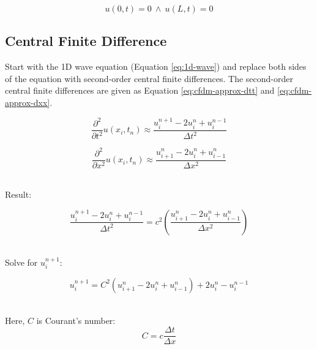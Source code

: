 \documentclass{article}
\begin{document}
\begin{equation}
    u(0,t)=0\ \wedge\ u(L,t)=0
    \label{eq:bc}
\end{equation}

\subsection{Central Finite Difference}


Start with the 1D wave equation (Equation \ref{eq:1d-wave}) and replace both sides of the equation with second-order central finite differences. The second-order central finite differences are given as Equation \ref{eq:cfdm-approx-dtt} and \ref{eq:cfdm-approx-dxx}.

\begin{equation}
    \frac{\partial^2}{\partial t^2}u(x_i,t_n)\approx \frac{u_i^{n+1}-2u_i^n+u_i^{n-1}}{\Delta t^2}
    \label{eq:cfdm-approx-dtt}
\end{equation}

\begin{equation}
    \frac{\partial^2}{\partial x^2}u(x_i,t_n)\approx \frac{u_{i+1}^{n}-2u_i^n+u_{i-1}^{n}}{\Delta x^2}
    \label{eq:cfdm-approx-dxx}
\end{equation}

\newpage
\noindent\\Result:

\begin{equation}
    \frac{u_i^{n+1}-2u_i^n+u_i^{n-1}}{\Delta t^2}
    = c^2\left(
    \frac{u_{i+1}^{n}-2u_i^n+u_{i-1}^{n}}{\Delta x^2}
    \right)
    \label{}
\end{equation}

\noindent\\Solve for $u_i^{n+1}$:

\begin{equation}
    u_i^{n+1} = C^2(u_{i+1}^n - 2u_i^n + u_{i-1}^n) + 2u_i^n-u_i^{n-1}
    \label{eq:cfdm}
\end{equation}

\noindent\\Here, $C$ is Courant's number:
\begin{equation}
    C=c\frac{\Delta t}{\Delta x}
\end{equation}
\end{document}
